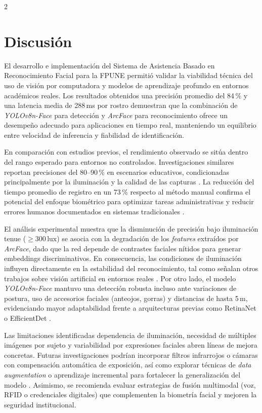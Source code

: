 \documentclass[10pt,a4paper]{article}
\begin{document}
\begin{multicols}{2}




\section{Discusión}

El desarrollo e implementación del Sistema de Asistencia Basado en Reconocimiento Facial para la FPUNE permitió validar la viabilidad técnica del uso de visión por computadora y modelos de aprendizaje profundo en entornos académicos reales. Los resultados obtenidos una precisión promedio del 84\,\% y una latencia media de 288\,ms por rostro demuestran que la combinación de \textit{YOLOv8n-Face} para detección y \textit{ArcFace} para reconocimiento ofrece un desempeño adecuado para aplicaciones en tiempo real, manteniendo un equilibrio entre velocidad de inferencia y fiabilidad de identificación.

En comparación con estudios previos, el rendimiento observado se sitúa dentro del rango esperado para entornos no controlados. Investigaciones similares reportan precisiones del 80–90\,\% en escenarios educativos, condicionadas principalmente por la iluminación y la calidad de las capturas \cite{attendanceManagement,prototipoUNIANDES,registroAsistenciaUTA}. La reducción del tiempo promedio de registro en un 73\,\% respecto al método manual confirma el potencial del enfoque biométrico para optimizar tareas administrativas y reducir errores humanos documentados en sistemas tradicionales \cite{automatizacionAsistencia}.

El análisis experimental muestra que la disminución de precisión bajo iluminación tenue (\(\geq 300\,\text{lux}\)) se asocia con la degradación de los \textit{features} extraídos por \textit{ArcFace}, dado que la red depende de contrastes faciales nítidos para generar embeddings discriminativos. En consecuencia, las condiciones de iluminación influyen directamente en la estabilidad del reconocimiento, tal como señalan otros trabajos sobre visión artificial en entornos reales \cite{reconocimientoVeridas,detecFacialOpenCV}. Por otro lado, el modelo \textit{YOLOv8n-Face} mantuvo una detección robusta incluso ante variaciones de postura, uso de accesorios faciales (anteojos, gorras) y distancias de hasta 5\,m, evidenciando mayor adaptabilidad frente a arquitecturas previas como RetinaNet o EfficientDet \cite{fatima2024yolov8}.

Las limitaciones identificadas dependencia de iluminación, necesidad de múltiples imágenes por sujeto y variabilidad por expresiones faciales abren líneas de mejora concretas. Futuras investigaciones podrían incorporar filtros infrarrojos o cámaras con compensación automática de exposición, así como explorar técnicas de \textit{data augmentation} o aprendizaje incremental para fortalecer la generalización del modelo \cite{perez2021,urgel2021}. Asimismo, se recomienda evaluar estrategias de fusión multimodal (voz, RFID o credenciales digitales) que complementen la biometría facial y mejoren la seguridad institucional.


\end{multicols}
\end{document}
